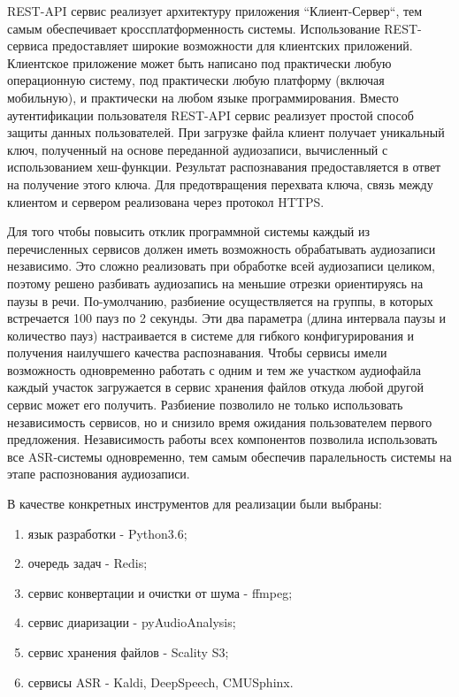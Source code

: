 \documentclass[conference]{IEEEtran}
\begin{document}
REST-API сервис реализует архитектуру приложения ``Клиент-Сервер``, тем самым обеспечивает кроссплатформенность системы.
Использование REST-сервиса предоставляет широкие возможности для клиентских приложений. Клиентское приложение может быть написано под практически любую операционную систему, под практически любую платформу (включая мобильную), и практически на любом языке программирования.
Вместо аутентификации пользователя REST-API сервис реализует простой способ защиты данных пользователей.
При загрузке файла клиент получает уникальный ключ, полученный на основе переданной аудиозаписи, вычисленный с использованием хеш-функции.
Результат распознавания предоставляется в ответ на получение этого ключа.
Для предотвращения перехвата ключа, связь между клиентом и сервером реализована через протокол HTTPS\@.

Для того чтобы повысить отклик программной системы каждый из перечисленных сервисов должен иметь возможность обрабатывать аудиозаписи независимо.
Это сложно реализовать при обработке всей аудиозаписи целиком, поэтому решено разбивать аудиозапись на меньшие отрезки ориентируясь на паузы в речи.
По-умолчанию, разбиение осуществляется на группы, в которых встречается 100 пауз по 2 секунды. Эти два параметра (длина интервала паузы и количество пауз) настраивается в системе для гибкого конфигурирования и получения наилучшего качества распознавания.
Чтобы сервисы имели возможность одновременно работать с одним и тем же участком аудиофайла каждый участок загружается в сервис хранения файлов откуда любой другой сервис может его получить.
Разбиение позволило не только использовать независимость сервисов, но и снизило время ожидания пользователем первого предложения.
Независимость работы всех компонентов позволила использовать все ASR-системы одновременно, тем самым обеспечив паралельность системы на этапе распознования аудиозаписи.

В качестве конкретных инструментов для реализации были выбраны:

\begin{enumerate}
\item язык разработки - Python3.6;
\item очередь задач - Redis;
\item сервис конвертации и очистки от шума - ffmpeg;
\item сервис диаризации - pyAudioAnalysis;
\item сервис хранения файлов - Scality S3;
\item сервисы ASR - Kaldi, DeepSpeech, CMUSphinx.
\end{enumerate}
\end{document}
